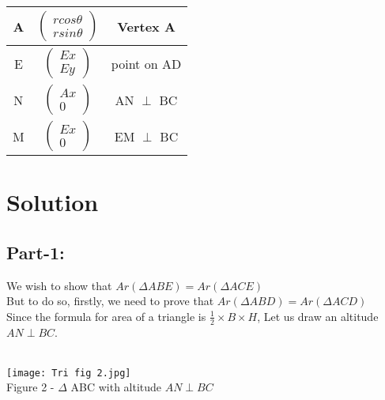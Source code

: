 \documentclass[journal,12pt,twocolumn]{IEEEtran}
\begin{document}
\centering
\begin{tabular}{|c|c|c|}

\hline

A & $\begin{pmatrix} rcos\theta \\ rsin\theta \end{pmatrix}$ & Vertex A\\

\hline

E & $\begin{pmatrix}Ex \\Ey \end{pmatrix}$ & point on AD\\

\hline

N & $\begin{pmatrix}Ax \\ 0 \end{pmatrix}$ & AN $\perp$ BC\\

\hline

M & $\begin{pmatrix}Ex \\ 0 \end{pmatrix}$ & EM $\perp$ BC\\

\hline

\end{tabular}

\section{Solution}
\raggedright{\subsection{Part-1:}}
We wish to show that
$Ar(\Delta ABE)=Ar(\Delta ACE)$\\
\vspace{0.25cm}
But to do so, firstly, we need to prove that $Ar(\Delta ABD)=Ar(\Delta ACD)$\\
\vspace{0.25cm}
Since the formula for area of a triangle is $\frac{1}{2}\times B \times H$, Let us draw an altitude $AN \perp BC$.\\
\
\begin{center}
\texttt{[image: Tri fig 2.jpg]}\\
Figure 2 - $\Delta$ ABC with altitude ${AN} \perp {BC}$ \\
\end{center}
\end{document}
